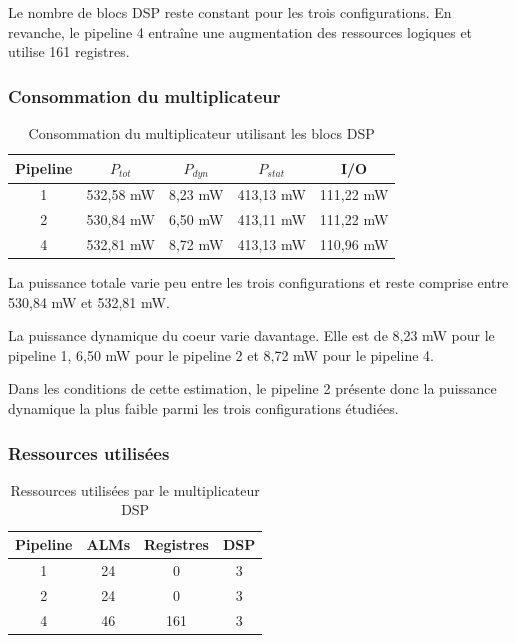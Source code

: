 \documentclass[12pt,a4paper]{article}
\begin{document}
Le nombre de blocs DSP reste constant pour les trois configurations.
En revanche, le pipeline 4 entraîne une augmentation des ressources
logiques et utilise 161 registres.

\subsubsection{Consommation du multiplicateur}

\begin{table}[H]
    \centering
    \caption{Consommation du multiplicateur utilisant les blocs DSP}

    \begin{tabular}{ccccc}
        \toprule
        \textbf{Pipeline} &
        \textbf{$P_{tot}$} &
        \textbf{$P_{dyn}$} &
        \textbf{$P_{stat}$} &
        \textbf{I/O} \\
        \midrule
        1 & 532,58 mW & 8,23 mW & 413,13 mW & 111,22 mW \\
        2 & 530,84 mW & 6,50 mW & 413,11 mW & 111,22 mW \\
        4 & 532,81 mW & 8,72 mW & 413,13 mW & 110,96 mW \\
        \bottomrule
    \end{tabular}
\end{table}

La puissance totale varie peu entre les trois configurations et
reste comprise entre 530,84 mW et 532,81 mW.

La puissance dynamique du coeur varie davantage. Elle est de
8,23 mW pour le pipeline 1, 6,50 mW pour le pipeline 2 et
8,72 mW pour le pipeline 4.

Dans les conditions de cette estimation, le pipeline 2 présente
donc la puissance dynamique la plus faible parmi les trois
configurations étudiées.



\subsubsection{Ressources utilisées}

\begin{table}[H]
    \centering

    \caption{Ressources utilisées par le multiplicateur DSP}

    \begin{tabular}{cccc}
        \toprule

        \textbf{Pipeline} &
        \textbf{ALMs} &
        \textbf{Registres} &
        \textbf{DSP} \\

        \midrule

        1 & 24 & 0 & 3 \\
        2 & 24 & 0 & 3 \\
        4 & 46 & 161 & 3 \\

        \bottomrule
    \end{tabular}
\end{table}
\end{document}
